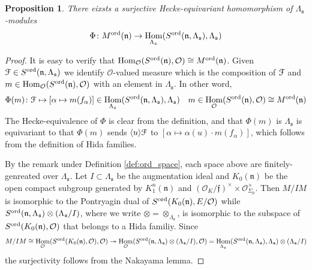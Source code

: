 \documentclass[leqno]{amsart}
\newcommand{\euF}{\EuScript{F}} %
\newcommand{\ord}{\textnormal{ord}}
\newcommand{\oo}{\mathcal{O}} %
\newcommand{\fs}{\mathfrak{s}}
\newcommand{\fn}{\mathfrak{n}}
\newcommand{\ff}{\mathfrak{f}}
\DeclareMathOperator{\Hom}{Hom}
\newtheorem{prop}[thm]{Proposition}
\theoremstyle{definition}
\theoremstyle{remark}
\begin{document}
\begin{prop}
	There eixsts a surjective Hecke-equivariant
	homomorphism of $\Lambda_{\fs}$-modules
	\[
		\Phi\colon M^{\ord}(\fn)\to 
		\Hom_{\Lambda_{\fs}}
		(S^{\ord}(\fn,\Lambda_{\fs}),\Lambda_{\fs})
	\]
\end{prop}
\begin{proof}
It is easy to verify that 
$\Hom_\oo(S^{\ord}(\fn),\oo)\cong M^{\ord}(\fn)$.
Given  $\euF\in S^{\ord}(\fn,\Lambda_{\fs})$
we identify $\oo$-valued measure which is
the composition of $\euF$
and $m\in \Hom_\oo(S^{\ord}(\fn),\oo)$
with an element in $\Lambda_{\fs}$.
In other word, 
\[
	\Phi(m)\colon \euF\mapsto
	[\alpha\mapsto m(f_\alpha)]
	\in \Hom_{\Lambda_{\fs}}
	(S^{\ord}(\fn,\Lambda_{\fs}),\Lambda_{\fs})\quad
	m\in \Hom_\oo(S^{\ord}(\fn),\oo)\cong M^{\ord}(\fn)
\]
The Hecke-equivalence of $\Phi$
is clear from the definition,
and that $\Phi(m)$ is $\Lambda_{\fs}$
is equivariant to that 
$\Phi(m)$ sends $\langle u\rangle \euF$
to $[\alpha\mapsto \alpha(u)\cdot m(f_\alpha)]$,
which follows from the definition of Hida families.

By the remark under Definition \ref{def:ord_space},
each space above are finitely-genreated over
$\Lambda_{\fs}$.
Let $I\subset \Lambda_{\fs}$ be the augmentation ideal
and $K_0(\fn)$ be the open compact subgroup generated
by  $K_1^n(\fn)$ and  
$(\oo_K/\ff)^\times\times \oo_{\Sigma_p}^\times$.
Then 
$M/IM$ is isomorphic to the Pontryagin dual
of  $S^{\ord}(K_0(\fn),E/\oo)$
while $S^{\ord}(\fn,\Lambda_{\fs})\otimes (\Lambda_{\fs}/I)$,
where we write $\otimes=\otimes_{\Lambda_{\fs}}$,
is isomorphic to the subspace of 
$S^{\ord}(K_0(\fn),\oo)$ that belongs to a Hida familiy.
Since 
\[
	M/IM\cong \Hom_{\oo}(S^{\ord}(K_0(\fn),\oo),\oo)
	\twoheadrightarrow
	\Hom_{\oo}(S^{\ord}(\fn,\Lambda_{\fs})
	\otimes(\Lambda_{\fs}/I),\oo)
	= \Hom_{\Lambda_{\fs}} 
	(S^{\ord}(\fn,\Lambda_{\fs}),\Lambda_{\fs})
	\otimes(\Lambda_{\fs}/I)
\]
the surjectivity follows from the Nakayama lemma.

	
\end{proof}
\end{document}
